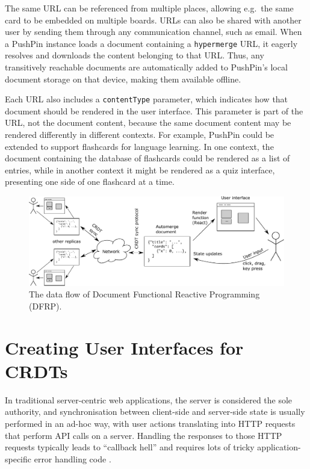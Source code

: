 \documentclass[sigplan,10pt]{acmart}
\begin{document}
The same URL can be referenced from multiple places, allowing e.g.\ the same card to be embedded on multiple boards.
URLs can also be shared with another user by sending them through any communication channel, such as email.
When a PushPin instance loads a document containing a \texttt{hypermerge} URL, it eagerly resolves and downloads the content belonging to that URL.
Thus, any transitively reachable documents are automatically added to PushPin's local document storage on that device, making them available offline.

Each URL also includes a \texttt{contentType} parameter, which indicates how that document should be rendered in the user interface.
This parameter is part of the URL, not the document content, because the same document content may be rendered differently in different contexts.
For example, PushPin could be extended to support flashcards for language learning.
In one context, the document containing the database of flashcards could be rendered as a list of entries, while in another context it might be rendered as a quiz interface, presenting one side of one flashcard at a time.

\begin{figure}
\centering
\includegraphics{document-frp.pdf}
\caption{The data flow of Document Functional Reactive Programming (DFRP).}
\label{fig:document-frp}
\end{figure}

\section{Creating User Interfaces for CRDTs}\label{sec:data-model-ui}

In traditional server-centric web applications, the server is considered the sole authority, and synchronisation between client-side and server-side state is usually performed in an ad-hoc way, with user actions translating into HTTP requests that perform API calls on a server.
Handling the responses to those HTTP requests typically leads to ``callback hell'' and requires lots of tricky application-specific error handling code \cite{Mogk2018distributedRP}.
\end{document}

